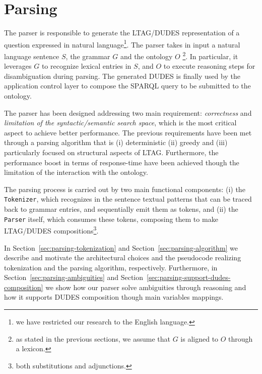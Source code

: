 \section{Parsing}
\label{sec:parsing}

The parser is responsible to generate the LTAG/DUDES representation of a question expressed in natural language\footnote{we have restricted our research to the English language.}. 
%
The parser takes in input a natural language sentence $S$, the grammar $G$ and the ontology $O$ \footnote{as stated in the previous sections, we assume that $G$ is aligned to $O$ through a lexicon.}.
%
In particular, it leverages $G$ to recognize lexical entries in $S$, and $O$ to execute reasoning steps for disambiguation during parsing.
%
The generated DUDES is finally used by the application control layer to compose the SPARQL query to be submitted to the ontology.


The parser has been designed addressing two main requirement: \textit{correctness} and \textit{limitation of the syntactic/semantic search space}, which is the most critical aspect to achieve better performance.
%
The previous requirements have been met through a parsing algorithm that is (i) deterministic (ii) greedy and (iii) particularly focused on structural aspects of LTAG.
Furthermore, the performance boost in terms of response-time have been achieved though the limitation of the interaction with the ontology.

The parsing process is carried out by two main functional components: 
(i) the \texttt{Tokenizer}, which recognizes in the sentence textual patterns that can be traced back to grammar entries, and sequentially emit them as tokens, and 
(ii) the \texttt{Parser} itself, which consumes these tokens, composing them to make LTAG/DUDES compositions\footnote{both substitutions and adjunctions.}.

In Section~\ref{sec:parsing-tokenization} and Section~\ref{sec:parsing-algorithm} we describe and motivate the architectural choices and the pseudocode realizing tokenization and the parsing algorithm, respectively.
%
Furthermore, in Section~\ref{sec:parsing-ambiguities} and Section~\ref{sec:parsing-support-dudes-composition} we show how our parser solve ambiguities through reasoning and how it supports DUDES composition though main variables mappings.




